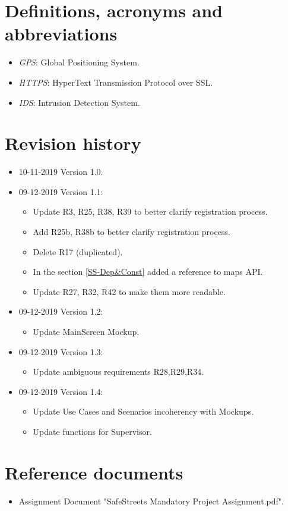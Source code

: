 \documentclass[a4paper]{report}
\begin{document}
\section{Definitions, acronyms and abbreviations}
\begin{itemize}
\item \textit{GPS}: Global Positioning System.
\item \textit{HTTPS}: HyperText Transmission Protocol over SSL.
\item \textit{IDS}: Intrusion Detection System.
\end{itemize}
\section{Revision history}
\begin{itemize}
\item 10-11-2019 Version 1.0.
\item 09-12-2019 Version 1.1:
	\begin{itemize} 
	\item Update R3, R25, R38, R39 to better clarify registration process.
	\item Add R25b, R38b to better clarify registration process.
	\item Delete R17 (duplicated).
	\item In the section \ref{SS-Dep&Const} added a reference to maps API.
	\item Update R27, R32, R42 to make them more readable.
	\end{itemize}
\item 09-12-2019 Version 1.2:
	\begin{itemize}
	\item Update MainScreen Mockup.
	\end{itemize}	
\item 09-12-2019 Version 1.3:
	\begin{itemize}
	\item Update ambiguous requirements R28,R29,R34.
	\end{itemize}
\item 09-12-2019 Version 1.4:
	\begin{itemize}
	\item Update Use Cases and Scenarios incoherency with Mockups.
	\item Update functions for Supervisor.
	\end{itemize}
\end{itemize}
\section{Reference documents}
\begin{itemize}
\item Assignment Document "SafeStreets Mandatory Project Assignment.pdf".
\end{itemize}
\end{document}
